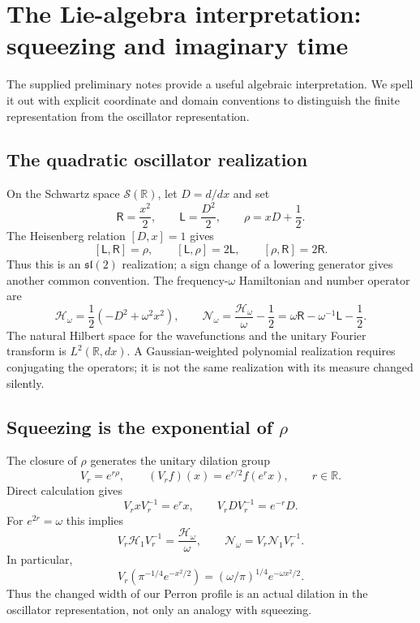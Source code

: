 \documentclass[11pt,reqno]{amsart}
\theoremstyle{definition}\newtheorem{definition}[theorem]{Definition}
\theoremstyle{remark}\newtheorem{remark}[theorem]{Remark}
\newcommand{\RR}{\mathbb R}
\begin{document}
\section{The Lie-algebra interpretation: squeezing and imaginary time}
\label{sec:Lie-algebra}
The supplied preliminary notes \cite{Notes} provide a useful algebraic
interpretation. We spell it out with explicit coordinate and domain
conventions to distinguish the finite representation from the oscillator
representation.

\subsection{The quadratic oscillator realization}
On the Schwartz space $\mathcal S(\RR)$, let $D=d/dx$ and set
\begin{equation}\label{eq:oscillator-sl2}
\mathsf R=\frac{x^2}{2},\qquad
\mathsf L=\frac{D^2}{2},\qquad
\rho=xD+\frac12.
\end{equation}
The Heisenberg relation $[D,x]=1$ gives
\begin{equation}\label{eq:oscillator-sl2-brackets}
[\mathsf L,\mathsf R]=\rho,\qquad
[\mathsf L,\rho]=2\mathsf L,\qquad
[\rho,\mathsf R]=2\mathsf R.
\end{equation}
Thus this is an $\mathfrak{sl}(2)$ realization; a sign change of a
lowering generator gives another common convention.
The frequency-$\omega$ Hamiltonian and number operator are
\begin{equation}\label{eq:omega-oscillator}
\mathscr H_\omega=\frac12(-D^2+\omega^2x^2),\qquad
\mathcal N_\omega=\frac{\mathscr H_\omega}{\omega}-\frac12
=\omega\mathsf R-\omega^{-1}\mathsf L-\frac12.
\end{equation}
The natural Hilbert space for the wavefunctions and the unitary Fourier
transform is $L^2(\RR,dx)$. A Gaussian-weighted polynomial realization
requires conjugating the operators; it is not the same realization
with its measure changed silently.

\subsection{Squeezing is the exponential of $\rho$}
The closure of $\rho$ generates the unitary dilation group
\begin{equation}\label{eq:dilation}
V_r=e^{r\rho},\qquad (V_rf)(x)=e^{r/2}f(e^rx),\qquad r\in\RR.
\end{equation}
Direct calculation gives
\[
V_rxV_r^{-1}=e^rx,\qquad V_rDV_r^{-1}=e^{-r}D.
\]
For $e^{2r}=\omega$ this implies
\begin{equation}\label{eq:squeezed-conjugacy}
V_r\mathscr H_1V_r^{-1}=\frac{\mathscr H_\omega}{\omega},\qquad
\mathcal N_\omega=V_r\mathcal N_1V_r^{-1}.
\end{equation}
In particular,
\[
V_r(\pi^{-1/4}e^{-x^2/2})
=(\omega/\pi)^{1/4}e^{-\omega x^2/2}.
\]
Thus the changed width of our Perron profile is an actual dilation
in the oscillator representation, not only an analogy with squeezing.
\end{document}
